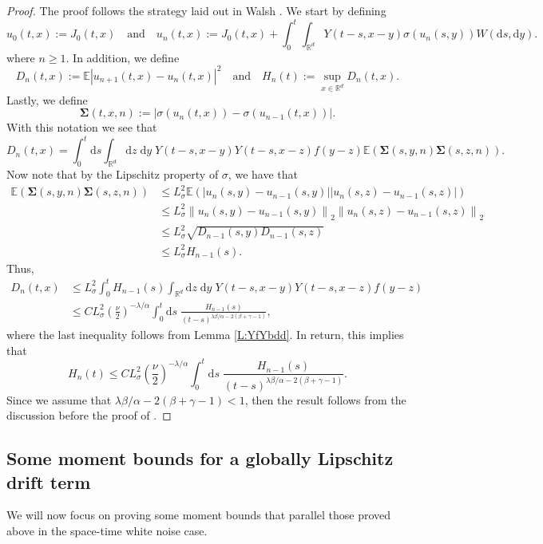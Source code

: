 \documentclass[a4paper,11pt]{article}
\numberwithin{equation}{section}
\theoremstyle{plain}
\theoremstyle{definition}
\newcommand{\ud}{\ensuremath{\mathrm{d} }}
\newcommand{\Norm}[1]{\left\|  #1   \right\|}
\newcommand{\R}{\mathbb{R}}
\numberwithin{NQ}{section}
\numberwithin{LQ}{section}
\numberwithin{ZQ}{section}
\begin{document}
\begin{proof}
  The proof follows the strategy laid out in Walsh \cite{walsh:86:introduction}. We start by
  defining
	\[
	u_0(t,x) := J_0(t,x) \quad \text{and} \quad u_n(t,x) := J_0(t,x) + \int_0^t \int_{\R^d} Y(t-s,x-y) \sigma(u_n(s,y)) W(\ud s, \ud y).
	\]
  where $ n \ge 1$. In addition, we define
	\[
	D_n(t,x) := \mathbb{E}\left| u_{n+1}(t,x) - u_n(t,x) \right|^2 \quad \text{and} \quad H_n(t) := \sup_{x \in \R^d} D_n(t,x).
	\]
  Lastly, we define
	\[
	\mathbf{\Sigma} (t,x,n) := | \sigma( u_n(t,x) ) - \sigma(u_{n-1} (t,x) ) |.
	\]
  With this notation we see that
	\[
	D_n(t,x) = \int_0^t \ud s \int_{\R^d} \ud z \; \ud y \; Y(t-s,x-y) Y(t-s,x-z) f(y-z) \mathbb{E}\left(\mathbf{\Sigma}(s,y,n) \mathbf{\Sigma}(s,z,n)\right).
	\]
  Now note that by the Lipschitz property of $\sigma$, we have that
	\begin{align*}
    \mathbb{E}\left(\mathbf{\Sigma}(s,y,n) \mathbf{\Sigma}(s,z,n)\right)
    & \le L^2_{\sigma} \mathbb{E} \left(|u_n(s,y)-u_{n-1}(s,y)||u_n(s,z)-u_{n-1}(s,z)|\right) \\
    & \le L^2_{\sigma} \Norm{ u_n(s,y)-u_{n-1}(s,y) }_2 \Norm{u_n(s,z)-u_{n-1}(s,z)}_2        \\
    & \le L^2_{\sigma} \sqrt{D_{n-1}(s,y) D_{n-1}(s,z)}                                       \\
    & \le L^2_{\sigma} H_{n-1}(s).
	\end{align*}
  Thus,
	\begin{align*}
	D_n(t,x) & \le L^2_{\sigma} \int_0^t H_{n-1}(s) \int_{\R^d} \ud z \; \ud y \; Y(t-s,x-y) Y(t-s,x-z) f(y-z) \\
           & \le C L^2_{\sigma} \left(\frac{\nu}{2}\right)^{-\lambda / \alpha} \int_0^t \ud s \; \frac{H_{n-1}(s)}{(t-s)^{\lambda \beta / \alpha - 2(\beta + \gamma -1)}},
	\end{align*}
  where the last inequality follows from Lemma \ref{L:YfYbdd}. In return, this implies that
	\[
	H_n(t) \le C L^2_{\sigma} \left(\frac{\nu}{2}\right)^{-\lambda / \alpha} \int_0^t \ud s \; \frac{H_{n-1}(s)}{(t-s)^{\lambda \beta / \alpha - 2(\beta + \gamma -1)}}.
	\]
  Since we assume that $\lambda \beta / \alpha - 2(\beta + \gamma -1) < 1$, then the result follows
  from the discussion before the proof of \cite[Lemma 3.3]{walsh:86:introduction}.
\end{proof}

\subsection{Some moment bounds for a globally Lipschitz drift term}
We will now focus on proving some moment bounds that parallel those proved above in the space-time
white noise case.
\end{document}

